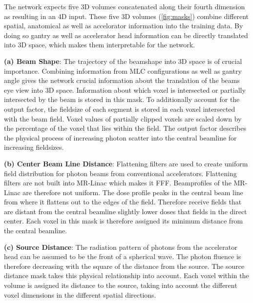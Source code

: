 The network expects five 3D volumes concatenated along their fourth dimension as resulting in an 4D input. 
These five 3D volumes (\autoref{fig:masks}) combine different spatial, anatomical as well as accelorator information into the training data. 
By doing so gantry as well as accelerator head information can be directly translated into 3D space, which makes them interpretable for the network. 

\setlength{\hangingindent}{1em}

\begin{hangingpar}
    \item \textbf{(a) Beam Shape}: The trajectory of the beamshape into 3D space is of crucial importance. 
    Combining information from \acs{MLC} configurations as well as gantry angle gives the network crucial information about the translation of the beams eye view into 3D space. 
    Information about which voxel is intersected or partially intersected by the beam is stored in this mask. 
    To additionally account for the output factor, the fieldsize of each segment is stored in each voxel intersected with the beam field. 
    Voxel values of partially clipped voxels are scaled down by the percentage of the voxel that lies within the field. 
    The output factor describes the physical process of increasing photon scatter into the central beamline for increasing fieldsizes. 
    
\end{hangingpar}

\begin{hangingpar}
    \item \textbf{(b) Center Beam Line Distance}: 
    Flattening filters are used to create uniform field distribution for photon beams from conventional accelerators.
    Flattening filters are not built into MR-Linac which makes it \ac{FFF}. 
    Beamprofiles of the MR-Linac are therefore not uniform.
    The dose profile peaks in the central beam line from where it flattens out to the edges of the field.
    Therefore receive fields that are distant from the central beamline slightly lower doses that fields in the direct center.
    Each voxel in this mask is therefore assigned its minimum distance from the central beamline. 
\end{hangingpar}

\begin{hangingpar}
    \item \textbf{(c) Source Distance}: 
    The radiation pattern of photons from the accelerator head can be assumed to be the front of a spherical wave. 
    The photon fluence is therefore decreasing with the square of the distance from the source. 
    The source distance mask takes this physical relationship into account. 
    Each voxel within the volume is assigned its distance to the source, taking into account the different voxel dimensions in the different spatial directions. 
    
\end{hangingpar}

